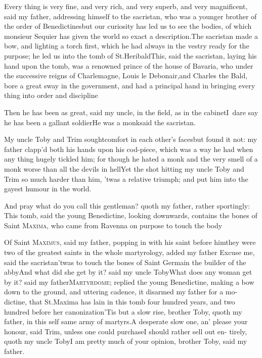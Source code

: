 \documentclass{article}
\begin{document}
Every thing is very fine, and very rich, and very superb, and very magnificent, said
my father, addressing himself to the sacristan, who was a younger brother of the
order of Benedictines\tsk but our curi\-osity has led us to see the bodies, of which
monsieur Sequier has given the world so exact a description.\tsk The sacristan made a
bow, and lighting a torch first, which he had always in the vestry ready for the
purpose; he led us into the
tomb of St.\@ Heribald\tsh This, said the sacristan,
laying his hand upon the tomb, was a renowned prince of the house of Bavaria, who
under the successive reigns of Charlemagne, Louis le Debonair,\break and Charles the
Bald, bore a great sway in the government, and had a principal hand in bringing
every thing into order and discipline\tsh

Then he has been as great, said my uncle, in the field, as in
the cabinet\tsk I~dare say he has been a gallant
soldier\break\tsh He was a monk\tsk said the sacristan.

My uncle Toby and Trim sought\break comfort in each
other’s faces\tsk but found it not: my father clapp’d both
his hands upon his cod-piece, which was a way he had when any thing
hugely tickled him; for though he hated a monk and the very smell
of a monk worse than all the devils in hell\tsh Yet the
shot hitting my uncle Toby and Trim so much harder
than him, ’twas a relative triumph; and put him into the
gayest humour in the world.

\tsh And pray what do you call this gentleman? quoth my
father, rather sportingly: This tomb, said the young
Benedictine, looking downwards, contains the bones of Saint
\textsc{Maxima}, who came from Ravenna on purpose to
touch the body\tsh

\tsh Of Saint \textsc{Maximus}, said my fa\-ther, popping in with his saint before
him\break\tsk they were two of the greatest saints in the whole martyrology, added
my father
\tsh Excuse me, said the sacristan\tsh\break\tsh ’twas to touch the bones
of Saint Germain the builder of the abby\tsh And what did she
get by it? said my uncle Toby\tsh What does any woman get by it?
said my father\tsh \textsc{Martyrdome}; replied the young
Benedictine, making a bow down to the ground, and uttering 
cadence, it disarmed my
father for a mo-\break
{}\break dictine,
that St.\@ Maxima has lain in this tomb four hundred years, and
two hundred before her canonization\tsh ’Tis but a slow rise,
brother Toby, quoth my father, in this self same army of
martyrs.\break\tsh A desperate slow one, an’ please your honour, said
Trim, unless one could purchase\tsh I should rather sell out
en- tirely, quoth my uncle Toby\tsh I am pretty much of your
opinion, brother Toby, said my father.
\end{document}
